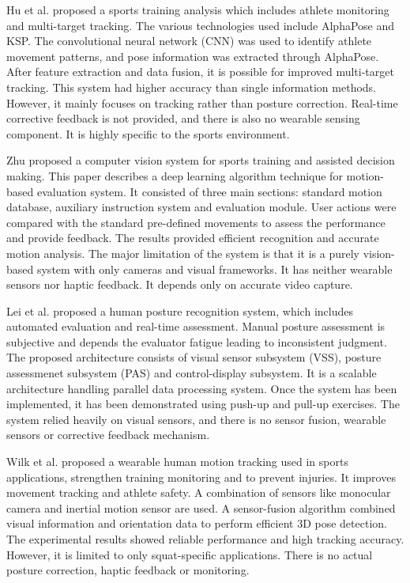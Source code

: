 \documentclass[conference]{IEEEtran}
\begin{document}
Hu et al. proposed a sports training analysis which includes athlete monitoring and multi-target tracking. The various technologies used include AlphaPose and KSP. The convolutional neural network (CNN) was used to identify athlete movement patterns, and pose information was extracted through AlphaPose. After feature extraction and data fusion, it is possible for improved multi-target tracking. This system had higher accuracy than single information methods. However, it mainly focuses on tracking rather than posture correction. Real-time corrective feedback is not provided, and there is also no wearable sensing component. It is highly specific to the sports environment.

Zhu proposed a computer vision system for sports training and assisted decision making. This paper describes a deep learning algorithm technique for motion-based evaluation system. It consisted of three main sections: standard motion database, auxiliary instruction system and evaluation module. User actions were compared with the standard pre-defined movements to assess the performance and provide feedback. The results provided efficient recognition and accurate motion analysis. The major limitation of the system is that it is a purely vision-based system with only cameras and visual frameworks. It has neither wearable sensors nor haptic feedback. It depends only on accurate video capture.

Lei et al. proposed a human posture recognition system, which includes automated evaluation and real-time assessment. Manual posture assessment is subjective and depends the evaluator fatigue leading to inconsistent judgment. The proposed architecture consists of visual sensor subsystem (VSS), posture assessmenet subsystem (PAS) and control-display subsystem. It is a scalable architecture handling parallel data processing system. Once the system has been implemented, it has been demonstrated using push-up and pull-up exercises. The system relied heavily on visual sensors, and there is no sensor fusion, wearable sensors or corrective feedback mechanism.

Wilk et al. proposed a wearable human motion tracking used in sports applications, strengthen training monitoring and to prevent injuries. It improves movement tracking and athlete safety. A combination of sensors like monocular camera and inertial motion sensor are used. A sensor-fusion algorithm combined visual information and orientation data to perform efficient 3D pose detection. The experimental results showed reliable performance and high tracking accuracy. However, it is limited to only squat-specific applications. There is no actual posture correction, haptic feedback or monitoring. 
\end{document}
